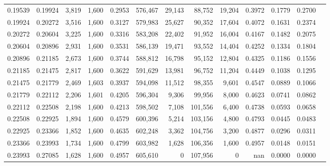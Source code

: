 \begin{tabular}{rrrrrrrrrrrrr}
0.19539 & 0.19924 &  3,819 & 1,600 &                                     0.2953 & 576,467 &  29,143 &  88,752 &  19,204 & 0.3972 & 0.1779 & 0.2700 \\
0.19924 & 0.20272 &  3,516 & 1,600 &                                     0.3127 & 579,983 &  25,627 &  90,352 &  17,604 & 0.4072 & 0.1631 & 0.2374 \\
0.20272 & 0.20604 &  3,225 & 1,600 &                                     0.3316 & 583,208 &  22,402 &  91,952 &  16,004 & 0.4167 & 0.1482 & 0.2075 \\
0.20604 & 0.20896 &  2,931 & 1,600 &                                     0.3531 & 586,139 &  19,471 &  93,552 &  14,404 & 0.4252 & 0.1334 & 0.1804 \\
0.20896 & 0.21185 &  2,673 & 1,600 &                                     0.3744 & 588,812 &  16,798 &  95,152 &  12,804 & 0.4325 & 0.1186 & 0.1556 \\
0.21185 & 0.21475 &  2,817 & 1,600 &                                     0.3622 & 591,629 &  13,981 &  96,752 &  11,204 & 0.4449 & 0.1038 & 0.1295 \\
0.21475 & 0.21779 &  2,469 & 1,603 &                                     0.3937 & 594,098 &  11,512 &  98,355 &   9,601 & 0.4547 & 0.0889 & 0.1066 \\
0.21779 & 0.22112 &  2,206 & 1,601 &                                     0.4205 & 596,304 &   9,306 &  99,956 &   8,000 & 0.4623 & 0.0741 & 0.0862 \\
0.22112 & 0.22508 &  2,198 & 1,600 &                                     0.4213 & 598,502 &   7,108 & 101,556 &   6,400 & 0.4738 & 0.0593 & 0.0658 \\
0.22508 & 0.22925 &  1,894 & 1,600 &                                     0.4579 & 600,396 &   5,214 & 103,156 &   4,800 & 0.4793 & 0.0445 & 0.0483 \\
0.22925 & 0.23366 &  1,852 & 1,600 &                                     0.4635 & 602,248 &   3,362 & 104,756 &   3,200 & 0.4877 & 0.0296 & 0.0311 \\
0.23366 & 0.23993 &  1,734 & 1,600 &                                     0.4799 & 603,982 &   1,628 & 106,356 &   1,600 & 0.4957 & 0.0148 & 0.0151 \\
0.23993 & 0.27085 &  1,628 & 1,600 &                                     0.4957 & 605,610 &       0 & 107,956 &       0 &    nan & 0.0000 & 0.0000 \\
\bottomrule
\end{tabular}
